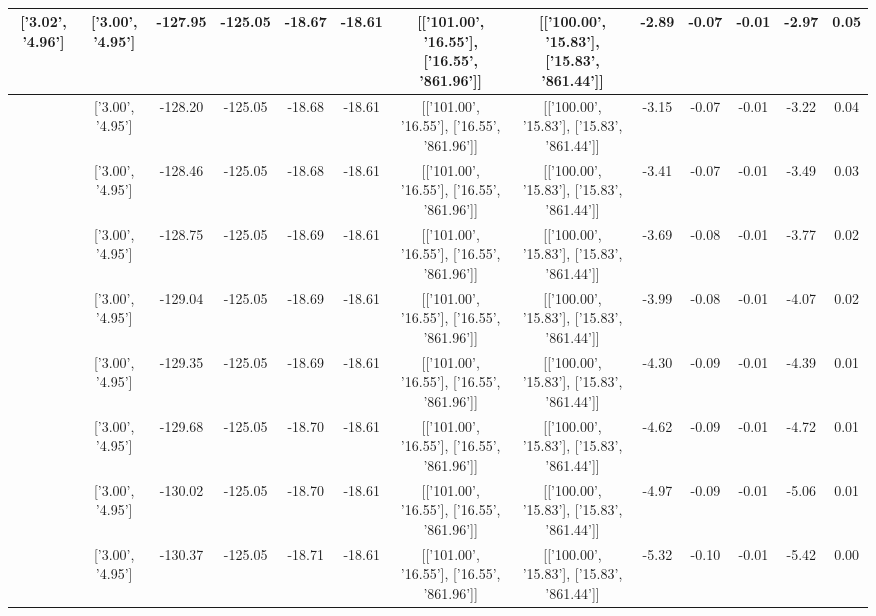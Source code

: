 \begin{table}[htbp]
\begin{adjustbox}{angle=90}
\begin{tabular}{|c|c|c|c|c|c|c|c|c|c|c|c|c|}
 ['3.02', '4.96'] & ['3.00', '4.95'] & -127.95 & -125.05 & -18.67 & -18.61 & [['101.00', '16.55'], ['16.55', '861.96']] & [['100.00', '15.83'], ['15.83', '861.44']] & -2.89 & -0.07 & -0.01 & -2.97 & 0.05\\ \hline
 ['3.02', '4.96'] & ['3.00', '4.95'] & -128.20 & -125.05 & -18.68 & -18.61 & [['101.00', '16.55'], ['16.55', '861.96']] & [['100.00', '15.83'], ['15.83', '861.44']] & -3.15 & -0.07 & -0.01 & -3.22 & 0.04\\ \hline
 ['3.02', '4.96'] & ['3.00', '4.95'] & -128.46 & -125.05 & -18.68 & -18.61 & [['101.00', '16.55'], ['16.55', '861.96']] & [['100.00', '15.83'], ['15.83', '861.44']] & -3.41 & -0.07 & -0.01 & -3.49 & 0.03\\ \hline
 ['3.02', '4.96'] & ['3.00', '4.95'] & -128.75 & -125.05 & -18.69 & -18.61 & [['101.00', '16.55'], ['16.55', '861.96']] & [['100.00', '15.83'], ['15.83', '861.44']] & -3.69 & -0.08 & -0.01 & -3.77 & 0.02\\ \hline
 ['3.02', '4.96'] & ['3.00', '4.95'] & -129.04 & -125.05 & -18.69 & -18.61 & [['101.00', '16.55'], ['16.55', '861.96']] & [['100.00', '15.83'], ['15.83', '861.44']] & -3.99 & -0.08 & -0.01 & -4.07 & 0.02\\ \hline
 ['3.03', '4.96'] & ['3.00', '4.95'] & -129.35 & -125.05 & -18.69 & -18.61 & [['101.00', '16.55'], ['16.55', '861.96']] & [['100.00', '15.83'], ['15.83', '861.44']] & -4.30 & -0.09 & -0.01 & -4.39 & 0.01\\ \hline
 ['3.03', '4.96'] & ['3.00', '4.95'] & -129.68 & -125.05 & -18.70 & -18.61 & [['101.00', '16.55'], ['16.55', '861.96']] & [['100.00', '15.83'], ['15.83', '861.44']] & -4.62 & -0.09 & -0.01 & -4.72 & 0.01\\ \hline
 ['3.03', '4.96'] & ['3.00', '4.95'] & -130.02 & -125.05 & -18.70 & -18.61 & [['101.00', '16.55'], ['16.55', '861.96']] & [['100.00', '15.83'], ['15.83', '861.44']] & -4.97 & -0.09 & -0.01 & -5.06 & 0.01\\ \hline
 ['3.03', '4.96'] & ['3.00', '4.95'] & -130.37 & -125.05 & -18.71 & -18.61 & [['101.00', '16.55'], ['16.55', '861.96']] & [['100.00', '15.83'], ['15.83', '861.44']] & -5.32 & -0.10 & -0.01 & -5.42 & 0.00\\ \hline
            \end{tabular}
        \end{adjustbox}
        \caption{}
        \label{}
    \end{table}
    